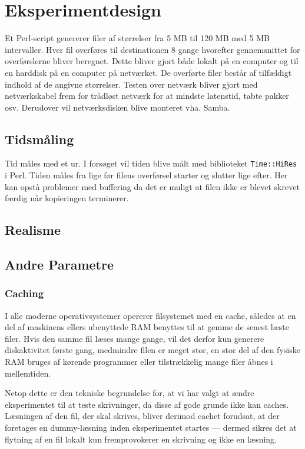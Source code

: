 \documentclass{article}
\author{Mikkel, Jannik, Rune \& Rasmus}
\date{\today}
\begin{document}
\section{Eksperimentdesign}

Et Perl-script genererer filer af størrelser fra 5 MB til 120 MB med 5 MB intervaller. Hver fil overføres til destinationen 8 gange hvorefter gennemsnittet for overførslerne bliver beregnet. Dette bliver gjort både lokalt på en computer og til en harddisk på en computer på netværket. De overførte filer består af tilfældigt indhold af de angivne størrelser. Testen over netværk bliver gjort med netværkskabel frem for trådløst netværk for at mindste latenstid, tabte pakker osv. Derudover vil netværksdisken blive monteret vha. Samba.

\subsection{Tidsmåling}
Tid måles med et ur. I forsøget vil tiden blive målt med biblioteket {\tt Time::HiRes} i Perl. Tiden måles fra lige før filens overførsel starter og slutter lige efter. Her kan opstå problemer med buffering da det er muligt at filen ikke er blevet skrevet færdig når kopieringen terminerer.

\subsection{Realisme}


\subsection{Andre Parametre}
\subsubsection{Caching}
I alle moderne operativsystemer opererer filsystemet med en cache, således at en del af maskinens ellers ubenyttede RAM benyttes til at gemme de senest læste filer. Hvis den samme fil læses mange gange, vil det derfor kun generere diskaktivitet første gang, medmindre filen er meget stor, en stor del af den fysiske RAM bruges af kørende programmer eller tilstrækkelig mange filer åbnes i mellemtiden.

Netop dette er den tekniske begrundelse for, at vi har valgt at ændre eksperimentet til at teste skrivninger, da disse af gode grunde ikke kan caches. Læsningen af den fil, der skal skrives, bliver derimod cachet forudsat, at der foretages en dummy-læsning inden eksperimentet startes --- dermed sikres det at flytning af en fil lokalt kun fremprovokerer en skrivning og ikke en læsning.
\end{document}
